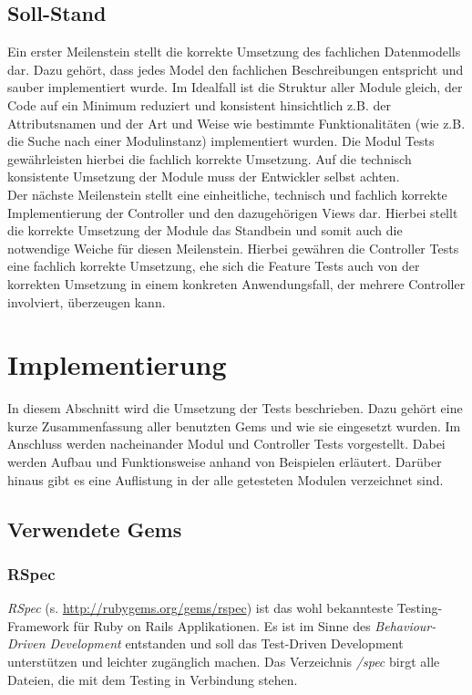 \documentclass[12pt,             %
               a4paper,          %
               listof=totoc,     %
               index=totoc,      %
               bibliography=totoc,%
               oneside,         %
               BCOR1cm,          %
               english   %
               ]{scrbook}
\begin{document}
\subsection{Soll-Stand} 
Ein erster Meilenstein stellt die korrekte Umsetzung des fachlichen Datenmodells dar. Dazu gehört, dass jedes Model den fachlichen Beschreibungen entspricht und sauber implementiert wurde. Im Idealfall ist die Struktur aller Module gleich, der Code auf ein Minimum reduziert und konsistent hinsichtlich z.B. der Attributsnamen und der Art und Weise wie bestimmte Funktionalitäten (wie z.B. die Suche nach einer Modulinstanz) implementiert wurden. Die Modul Tests gewährleisten hierbei die fachlich korrekte Umsetzung. Auf die technisch konsistente Umsetzung der Module muss der Entwickler selbst achten.\\
Der nächste Meilenstein stellt eine einheitliche, technisch und fachlich korrekte Implementierung der Controller und den dazugehörigen Views dar. Hierbei stellt die korrekte Umsetzung der Module das Standbein und somit auch die notwendige Weiche für diesen Meilenstein. Hierbei gewähren die Controller Tests eine fachlich korrekte Umsetzung, ehe sich die Feature Tests auch von der korrekten Umsetzung in einem konkreten Anwendungsfall, der mehrere Controller involviert, überzeugen kann.

\section{Implementierung}
In diesem Abschnitt wird die Umsetzung der Tests beschrieben. Dazu gehört eine kurze Zusammenfassung aller benutzten Gems und wie sie eingesetzt wurden. Im Anschluss werden nacheinander Modul und Controller Tests vorgestellt. Dabei werden Aufbau und Funktionsweise anhand von Beispielen erläutert. Darüber hinaus gibt es eine Auflistung in der alle getesteten Modulen verzeichnet sind.
\subsection{Verwendete Gems}
\subsubsection{RSpec}
\textit{RSpec} (s. \url{http://rubygems.org/gems/rspec}) ist das wohl bekannteste Testing-Framework für Ruby on Rails Applikationen. Es ist im Sinne des \textit{Behaviour-Driven Development} entstanden und soll das Test-Driven Development unterstützen und leichter zugänglich machen. Das Verzeichnis \textit{/spec} birgt alle Dateien, die mit dem Testing in Verbindung stehen.
\end{document}
